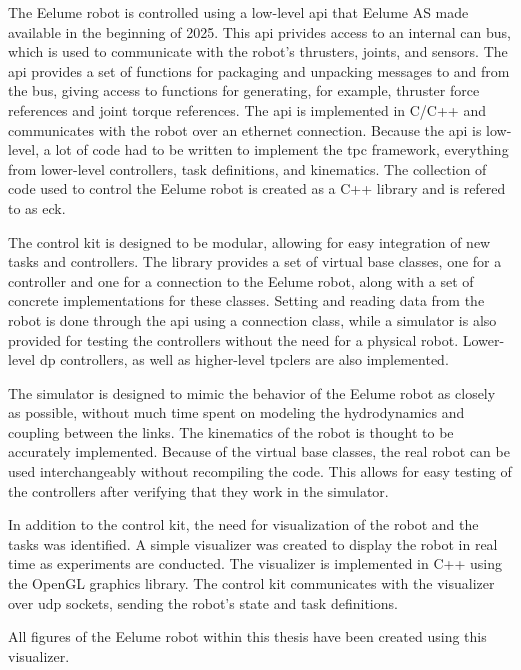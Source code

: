 The Eelume robot is controlled using a low-level \gls{api} that Eelume AS made
available in the beginning of 2025.
This \gls{api} privides access to an internal \gls{can} bus, which is used to
communicate with the robot's thrusters, joints, and sensors. The \gls{api} provides
a set of functions for packaging and unpacking messages to and from the bus, giving
access to functions for generating, for example, thruster force references and
joint torque references.
The \gls{api} is implemented in C/C++ and communicates with the robot over
an ethernet connection. Because the \gls{api} is low-level, a lot of code had
to be written to implement the \gls{tpc} framework, everything from
lower-level controllers, task definitions, and kinematics. The collection of
code used to control the Eelume robot is created as a C++ library
and is refered to as \gls{eck}.

The control kit is designed to be modular, allowing for easy integration of
new tasks and controllers. The library provides a set of virtual base classes,
one for a controller and one for a connection to the Eelume robot, along with
a set of concrete implementations for these classes. Setting and reading data
from the robot is done through the \gls{api} using a connection class, while 
a simulator is also provided for testing the controllers without the need for
a physical robot. Lower-level \gls{dp} controllers, as well as higher-level
\gls{tpc}lers are also implemented.

The simulator is designed to mimic the behavior of the Eelume robot as closely
as possible, without much time spent on modeling the hydrodynamics and coupling
between the links. The kinematics of the robot is thought to be accurately
implemented. Because of the virtual base classes, the real robot can be used
interchangeably without recompiling the code. This allows for easy testing of
the controllers after verifying that they work in the simulator.

In addition to the control kit, the need for visualization of the robot and
the tasks was identified. A simple visualizer was created to display the robot
in real time as experiments are conducted. The visualizer is implemented in
C++ using the OpenGL graphics library. The control kit communicates with the
visualizer over \gls{udp} sockets, sending the robot's state and task definitions.

All figures of the Eelume robot within this thesis have been created using this visualizer.

